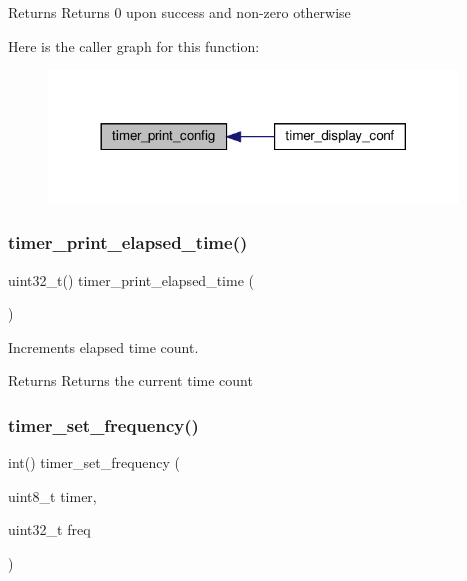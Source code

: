 \begin{DoxyReturn}{Returns}
Returns 0 upon success and non-\/zero otherwise 
\end{DoxyReturn}
Here is the caller graph for this function\+:\nopagebreak
\begin{figure}[H]
\begin{center}
\leavevmode
\includegraphics[width=308pt]{group__timer_gad3902e029b27c80982873394c0290496_icgraph}
\end{center}
\end{figure}
\mbox{\label{group__timer_ga43b221cba0c39b32f89688dcfee5aefa}} 
\subsubsection{\texorpdfstring{timer\+\_\+print\+\_\+elapsed\+\_\+time()}{timer\_print\_elapsed\_time()}}
{\footnotesize\ttfamily uint32\+\_\+t() timer\+\_\+print\+\_\+elapsed\+\_\+time (\begin{DoxyParamCaption}{ }\end{DoxyParamCaption})}



Increments elapsed time count. 

\begin{DoxyReturn}{Returns}
Returns the current time count 
\end{DoxyReturn}
\mbox{\label{group__timer_gaf2c04fa8e97ffa748fd3f612886a92a7}} 
\subsubsection{\texorpdfstring{timer\+\_\+set\+\_\+frequency()}{timer\_set\_frequency()}}
{\footnotesize\ttfamily int() timer\+\_\+set\+\_\+frequency (\begin{DoxyParamCaption}\item[{uint8\+\_\+t}]{timer,  }\item[{uint32\+\_\+t}]{freq }\end{DoxyParamCaption})}



